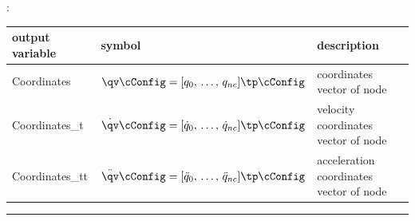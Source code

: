 :
\begin{center}
\footnotesize
\begin{longtable}{| p{5cm} | p{5cm} | p{6cm} |} 
\hline
\bf output variable & \bf symbol & \bf description \\ \hline
Coordinates & $\qv\cConfig = [q_0,\,\ldots,\,q_{nc}]\tp\cConfig$ & coordinates vector of node\\ \hline
Coordinates\_t & $\dot \qv\cConfig = [\dot q_0,\,\ldots,\,\dot q_{nc}]\tp\cConfig$ & velocity coordinates vector of node\\ \hline
Coordinates\_tt & $\ddot \qv\cConfig = [\ddot q_0,\,\ldots,\,\ddot q_{nc}]\tp\cConfig$ & acceleration coordinates vector of node\\ \hline
\end{longtable}
\end{center}
\par\noindent\rule{\textwidth}{0.4pt}
\label{description_NodeGenericODE2}
